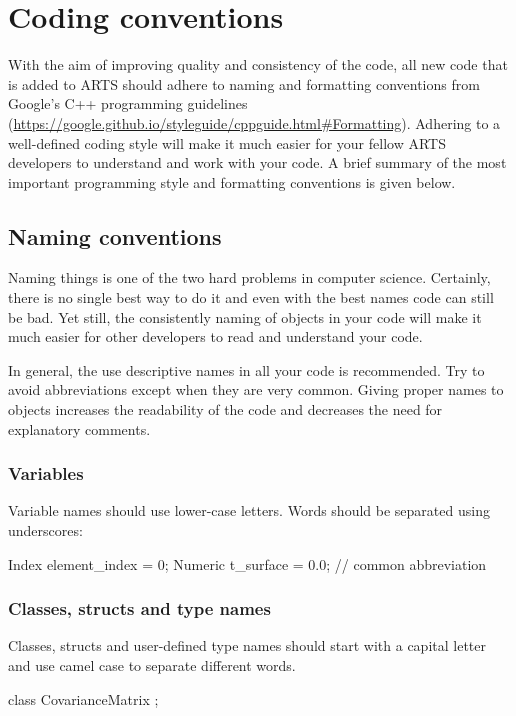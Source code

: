\section{Coding conventions}
\label{sec:development:conv}

With the aim of improving quality and consistency of the code, all new code that
is added to ARTS should adhere to naming and formatting conventions from
Google's C++ programming guidelines
(\url{https://google.github.io/styleguide/cppguide.html#Formatting}). Adhering
to a well-defined coding style will make it much easier for your fellow ARTS
developers to understand and work with your code. A brief summary of the most
important programming style and formatting conventions is given below.


\subsection{Naming conventions}

Naming things is one of the two hard problems in computer science. Certainly,
there is no single best way to do it and even with the best names code can still
be bad. Yet still, the consistently naming of objects in your code will make it
much easier for other developers to read and understand your code.

In general, the use descriptive names in all your code is recommended.
Try to avoid abbreviations except when they are very common. Giving proper
names to objects increases the readability of the code and decreases the need
for explanatory comments.

\subsubsection{Variables}
Variable names should use lower-case letters. Words should be separated using
underscores:
  \begin{code}
  Index element_index = 0;
  Numeric t_surface = 0.0; // common abbreviation
  \end{code}

\subsubsection{Classes, structs and type names}
Classes, structs and user-defined type names should start with a capital letter
and use camel case to separate different words.
  \begin{code}
  class CovarianceMatrix {};
  \end{code}

